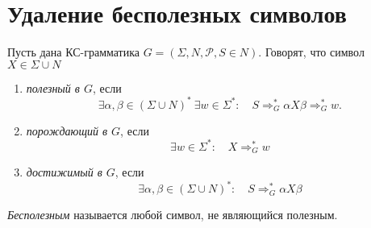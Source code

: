 \section{Удаление бесполезных символов}
\begin{Def}Пусть дана КС-грамматика $G=(\Sigma, N, \mathcal P, S \in N)$.
Говорят, что символ $X \in \Sigma \cup N$ 
\begin{enumerate}
    \item \emph{полезный в $G$}, если
    $$
        \exists \alpha, \beta \in (\Sigma \cup N)^{\ast} \:
        \exists w \in \Sigma^* \colon \quad
        S \Rightarrow^{\ast}_G \alpha X \beta \Rightarrow^{\ast}_G w. 
    $$
    \item \emph{порождающий в $G$}, если
    $$
        \exists w \in \Sigma^* \colon \quad X \Rightarrow^{\ast}_G w 
    $$
    \item  \emph{достижимый в $G$}, если
    $$
        \exists \alpha, \beta \in (\Sigma \cup N)^{\ast} \colon \quad 
        S \Rightarrow^{\ast}_G \alpha X \beta
    $$
\end{enumerate}
\emph{Бесполезным} называется любой символ, не являющийся полезным.
\end{Def}

